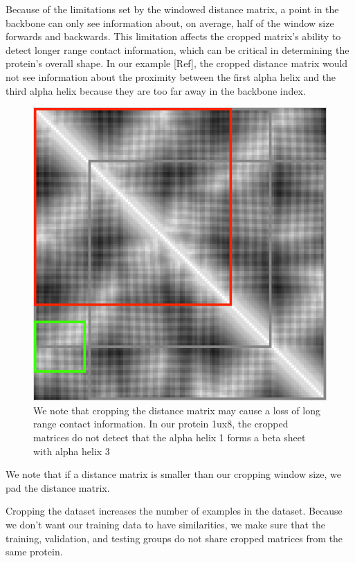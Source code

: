 \documentclass[12pt, a4paper, twocolumn, fullpage]{article}
\theoremstyle{plain}
\theoremstyle{definition}
\theoremstyle{remark}
\begin{document}
Because of the limitations set by the windowed distance matrix, a point in the backbone can only see information about, on average, half of the window size forwards and backwards. This limitation affects the cropped matrix's ability to detect longer range contact information, which can be critical in determining the protein's overall shape. In our example [Ref], the cropped distance matrix would not see information about the proximity between the first alpha helix and the third alpha helix because they are too far away in the backbone index.

\begin{figure}[h]
    \centering
    \includegraphics[width=\linewidth]{cropMatMiss}
    \caption{We note that cropping the distance matrix may cause a loss of long range contact information. In our protein 1ux8, the cropped matrices do not detect that the alpha helix 1 forms a beta sheet with alpha helix 3}
    \label{cropMatMiss}
\end{figure}

We note that if a distance matrix is smaller than our cropping window size, we pad the distance matrix.

Cropping the dataset increases the number of examples in the dataset. Because we don't want our training data to have similarities, we make sure that the training, validation, and testing groups do not share cropped matrices from the same protein.
\end{document}
